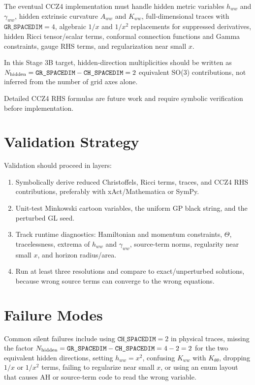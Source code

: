 \documentclass[11pt]{article}
\newcommand{\GRSP}{\texttt{GR\_SPACEDIM}}
\newcommand{\CHSP}{\texttt{CH\_SPACEDIM}}
\begin{document}
The eventual CCZ4 implementation must handle hidden metric variables
\(h_{ww}\) and \(\gamma_{ww}\), hidden extrinsic curvature \(A_{ww}\) and
\(K_{ww}\), full-dimensional traces with \(\GRSP=4\), algebraic \(1/x\) and
\(1/x^2\) replacements for suppressed derivatives, hidden Ricci tensor/scalar
terms, conformal connection functions and Gamma constraints, gauge RHS terms,
and regularization near small \(x\).

In this Stage 3B target, hidden-direction multiplicities should be written as
\(N_{\rm hidden}=\GRSP-\CHSP=2\) equivalent SO(3) contributions, not inferred
from the number of grid axes alone.

Detailed CCZ4 RHS formulas are future work and require symbolic verification
before implementation.

\section{Validation Strategy}

Validation should proceed in layers:
\begin{enumerate}
  \item Symbolically derive reduced Christoffels, Ricci terms, traces, and CCZ4
    RHS contributions, preferably with xAct/Mathematica or SymPy.
  \item Unit-test Minkowski cartoon variables, the uniform GP black string, and
    the perturbed GL seed.
  \item Track runtime diagnostics: Hamiltonian and momentum constraints,
    \(\Theta\), tracelessness, extrema of \(h_{ww}\) and \(\gamma_{ww}\),
    source-term norms, regularity near small \(x\), and horizon radius/area.
  \item Run at least three resolutions and compare to exact/unperturbed
    solutions, because wrong source terms can converge to the wrong equations.
\end{enumerate}

\section{Failure Modes}

Common silent failures include using \(\CHSP=2\) in physical traces, missing
the factor \(N_{\rm hidden}=\GRSP-\CHSP=4-2=2\) for the two equivalent hidden
directions, setting \(h_{ww}=x^2\), confusing \(K_{ww}\) with
\(K_{\theta\theta}\), dropping \(1/x\) or \(1/x^2\) terms, failing to
regularize near small \(x\), or using an enum layout that causes AH or
source-term code to read the wrong variable.
\end{document}
